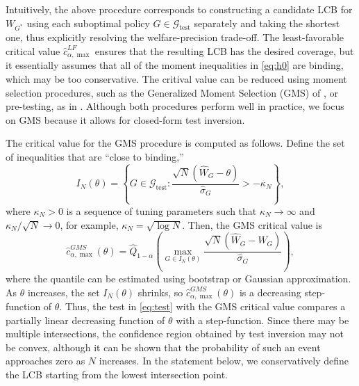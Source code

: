 \documentclass[12pt]{article}
\numberwithin{equation}{section}
\theoremstyle{plain}                         %
\theoremstyle{definition}                  %
\theoremstyle{remark}                      %
\begin{document}
Intuitively, the above procedure corresponds to constructing a candidate LCB for $W_{G^*}$ using each suboptimal policy $G \in \mathcal{G}_{\text{test}}$ separately and taking the shortest one, thus explicitly resolving the welfare-precision trade-off. The least-favorable critical value $\hat{c}_{\alpha, \max}^{LF}$ ensures that the resulting LCB has the desired coverage, but it essentially assumes that all of the moment inequalities in \eqref{eq:h0} are binding, which may be too conservative. The critival value can be reduced using moment selection procedures, such as the Generalized Moment Selection (GMS) of \citet{andrews2010inference}, or pre-testing, as in \citet{romano2014practical}. Although both procedures perform well in practice, we focus on GMS because it allows for closed-form test inversion. 


The critical value for the GMS procedure is computed as follows. Define the set of inequalities that are ``close to binding,''
\[
I_{N}(\theta) = \left\{G \in \mathcal{G}_{\text{test}}: \frac{\sqrt{N}(\hat{W}_G - \theta)}{\hat{\sigma}_G}  > -\kappa_{N} \right\},
\]
where $\kappa_N > 0$ is a sequence of tuning parameters such that $\kappa_N \to \infty$ and $\kappa_N / \sqrt{N} \to 0$, for example, $\kappa_N = \sqrt{\log N}$. Then, the GMS critical value is
\begin{equation} \label{eq:crit_val_gms}
	\hat{c}_{\alpha, \max}^{GMS}(\theta) = \hat{Q}_{1-\alpha}\left( \max \limits_{G \in I_N(\theta)}  \frac{\sqrt{N}(\widehat{W}_G - W_G)}{\hat{\sigma}_G} \right),
\end{equation}
where the quantile can be estimated using bootstrap or Gaussian approximation. As $\theta$ increases, the set $I_N(\theta)$ shrinks, so $\hat{c}_{\alpha, \max}^{GMS}(\theta)$ is a decreasing step-function of $\theta$. Thus, the test in \eqref{eq:test} with the GMS critical value compares a partially linear decreasing function of $\theta$ with a step-function. Since there may be multiple intersections, the confidence region obtained by test inversion may not be convex, although it can be shown that the probability of such an event approaches zero as $N$ increases. In the statement below, we conservatively define the LCB starting from the lowest intersection point.
\end{document}

